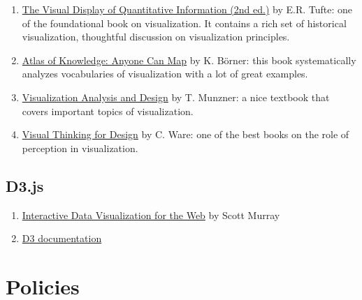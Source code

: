 \documentclass[11pt,article,oneside]{memoir}
\begin{document}
\begin{enumerate}

\item \href{http://www.amazon.com/gp/product/0961392142}{The Visual Display of Quantitative Information (2nd ed.)} by E.R. Tufte: one of the foundational book on visualization. It contains a rich set of historical visualization, thoughtful discussion on visualization principles. 

\item \href{http://www.amazon.com/Atlas-Knowledge-Anyone-Can-Map/dp/0262028816}{Atlas of Knowledge: Anyone Can Map} by K. Börner: this book systematically analyzes vocabularies of visualization with a lot of great examples. 

\item \href{http://www.amazon.com/Visualization-Analysis-Design-AK-Peters/dp/1466508914}{Visualization Analysis and Design} by T. Munzner: a nice textbook that covers important topics of visualization. 

\item \href{http://www.amazon.com/Visual-Thinking-Kaufmann-Interactive-Technologies/dp/0123708966}{Visual Thinking for Design} by C. Ware: one of the best books on the role of perception in visualization. 

\end{enumerate}

\subsection{D3.js}

\begin{enumerate}

\item \href{http://www.amazon.com/Interactive-Data-Visualization-Scott-Murray/dp/1449339735}{Interactive Data Visualization for the Web} by Scott Murray

\item \href{https://github.com/mbostock/d3/wiki}{D3 documentation}

\end{enumerate}

\section{Policies}
\end{document}
